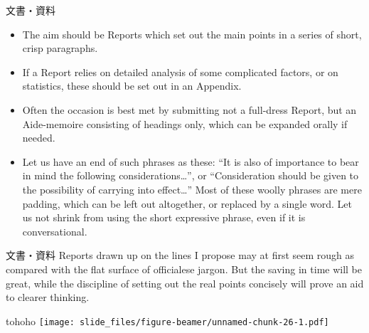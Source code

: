 \documentclass[
  ignorenonframetext,
]{beamer}
\providecommand{\tightlist}{%
  \setlength{\itemsep}{0pt}\setlength{\parskip}{0pt}}
\begin{document}
\begin{frame}{文書・資料}
\protect\hypertarget{ux6587ux66f8ux8cc7ux6599}{}
\begin{itemize}[<+->]
\tightlist
\item
  \textbullet{}\hspace{2pt} The aim should be Reports which set out the
  main points in a series of short, crisp paragraphs.
\item
  \textbullet{}\hspace{2pt} If a Report relies on detailed analysis of
  some complicated factors, or on statistics, these should be set out in
  an Appendix.
\item
  \textbullet{}\hspace{2pt} Often the occasion is best met by submitting
  not a full-dress Report, but an Aide-memoire consisting of headings
  only, which can be expanded orally if needed.
\item
  \textbullet\hspace{2pt}Let us have an end of such phrases as these:
  ``It is also of importance to bear in mind the following
  considerations\ldots{}'', or ``Consideration should be given to the
  possibility of carrying into effect\ldots{}'' Most of these woolly
  phrases are mere padding, which can be left out altogether, or
  replaced by a single word. Let us not shrink from using the short
  expressive phrase, even if it is conversational.
\end{itemize}
\end{frame}

\begin{frame}{文書・資料}
\protect\hypertarget{ux6587ux66f8ux8cc7ux6599-1}{}
Reports drawn up on the lines I propose may at first seem rough as
compared with the flat surface of officialese jargon. But the saving in
time will be great, while the discipline of setting out the real points
concisely will prove an aid to clearer thinking.
\end{frame}

\begin{frame}{tohoho}
\protect\hypertarget{tohoho}{}
\texttt{[image: slide\_files/figure-beamer/unnamed-chunk-26-1.pdf]}
\end{frame}
\end{document}
